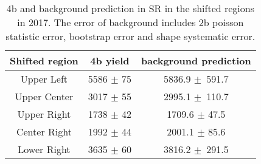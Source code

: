 
\begin{table}[ht]
    \centering
    \caption{\label{tbl:shifted-4b-yields} 4b and background prediction in SR in the shifted 
             regions in 2017. The error of background includes 2b poisson statistic error, 
             bootstrap error and shape systematic error.}
    \setlength\extrarowheight{5pt}
    \begin{tabular}{ccc}
        \toprule
            Shifted region & 4b yield & background prediction \\
        \midrule
            Upper Left   & 5586 $\pm$ 75 & 5836.9 $\pm$ 591.7 \\
            Upper Center & 3017 $\pm$ 55 & 2995.1 $\pm$ 110.7 \\
            Upper Right  & 1738 $\pm$ 42 & 1709.6 $\pm$ 47.5 \\
            Center Right & 1992 $\pm$ 44 & 2001.1 $\pm$ 85.6 \\
            Lower Right  & 3635 $\pm$ 60 & 3816.2 $\pm$ 291.5 \\
        \bottomrule
    \end{tabular}
\end{table}


